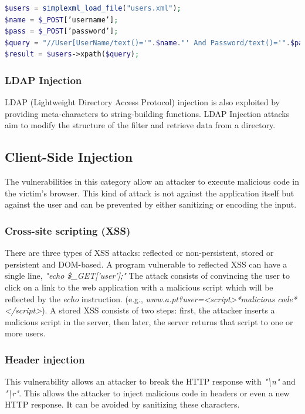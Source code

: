 \begin{lstlisting}[language=PHP,
    showstringspaces=false,
    caption={PHP code vulnerable to XPath Injection},
    label=xpath, float]
$users = simplexml_load_file("users.xml");
$name = $_POST[’username’];
$pass = $_POST[’password’];
$query = "//User[UserName/text()='".$name."' And Password/text()='".$pass."']";
$result = $users->xpath($query);
\end{lstlisting}

\subsubsection{LDAP Injection} 
LDAP (Lightweight Directory Access Protocol) injection is also exploited by providing meta-characters to string-building functions. LDAP Injection attacks aim to modify the structure of the filter and retrieve data from a directory.

\subsection{Client-Side Injection}
The vulnerabilities in this category allow an attacker to execute malicious code in the victim's browser. This kind of attack is not against the application itself but against the user and can be prevented by either sanitizing or encoding the input.
\subsubsection{Cross-site scripting (XSS)}
There are three types of XSS attacks: reflected or non-persistent, stored or persistent and DOM-based.
A program vulnerable to reflected XSS can have a single line, \textit{"echo \$\_GET['user'];"} 
The attack consists of convincing the user to click on a link to the web application with a malicious script which will be reflected by the \textit{echo} instruction. (e.g., \textit{www.a.pt?user=<script>*malicious code*</script>}).
A stored XSS consists of two steps: first, the attacker inserts a malicious script in the server, then later, the server returns that script to one or more users.

\subsubsection{Header injection} This vulnerability allows an attacker to break the HTTP  response with \textit{"\textbackslash n"} and \textit{"\textbackslash r"}. This allows the attacker to inject malicious code in headers or even a new HTTP  response. It can be avoided by sanitizing these characters.

